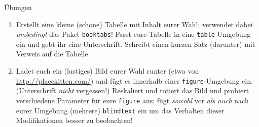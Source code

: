 \documentclass[11pt]{beamer}
\begin{document}
\begin{frame}{Übungen}
\begin{enumerate}
\item Erstellt eine kleine (schöne) Tabelle mit Inhalt eurer Wahl; verwendet dabei \emph{umbedingt} das Paket \texttt{booktabs}! Fasst eure Tabelle in eine \texttt{table}-Umgebung ein und gebt ihr eine Unterschrift. Schreibt einen kurzen Satz (darunter) mit Verweis auf die Tabelle.
\item Ladet euch ein (lustiges) Bild eurer Wahl runter (etwa von \url{http://placekitten.com/}) und fügt es innerhalb einer \texttt{figure}-Umgebung ein. (Unterschrift \emph{nicht} vergessen!) Reskaliert und rotiert das Bild und probiert verschiedene Parameter für eure \texttt{figure} aus; fügt \emph{sowohl} vor \emph{als auch} nach eurer Umgebung (mehrere) \texttt{blindtext} ein um das Verhalten dieser Modifikationen besser zu beobachten!
\end{enumerate}
\end{frame}
\end{document}
